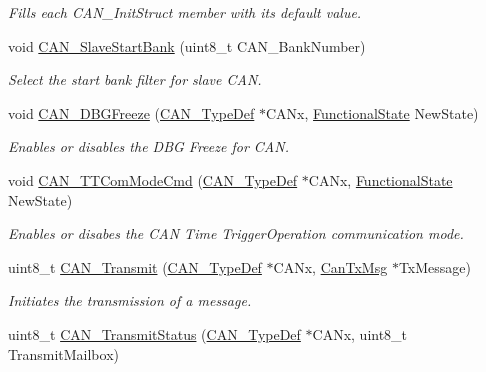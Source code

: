 \begin{DoxyCompactItemize}
\begin{DoxyCompactList}\small\item\em Fills each C\+A\+N\+\_\+\+Init\+Struct member with its default value. \end{DoxyCompactList}\item 
void \mbox{\hyperlink{group___c_a_n___private___functions_ga109ff8960bc59f44b984c9646f17b3c0}{C\+A\+N\+\_\+\+Slave\+Start\+Bank}} (uint8\+\_\+t C\+A\+N\+\_\+\+Bank\+Number)
\begin{DoxyCompactList}\small\item\em Select the start bank filter for slave C\+AN. \end{DoxyCompactList}\item 
void \mbox{\hyperlink{group___c_a_n___private___functions_gac0e2d33e08caf49d1f1251f0dcc20213}{C\+A\+N\+\_\+\+D\+B\+G\+Freeze}} (\mbox{\hyperlink{struct_c_a_n___type_def}{C\+A\+N\+\_\+\+Type\+Def}} $\ast$C\+A\+Nx, \mbox{\hyperlink{group___exported__types_gac9a7e9a35d2513ec15c3b537aaa4fba1}{Functional\+State}} New\+State)
\begin{DoxyCompactList}\small\item\em Enables or disables the D\+BG Freeze for C\+AN. \end{DoxyCompactList}\item 
void \mbox{\hyperlink{group___c_a_n___private___functions_ga94740177bab153ca5b102d122f9a8cca}{C\+A\+N\+\_\+\+T\+T\+Com\+Mode\+Cmd}} (\mbox{\hyperlink{struct_c_a_n___type_def}{C\+A\+N\+\_\+\+Type\+Def}} $\ast$C\+A\+Nx, \mbox{\hyperlink{group___exported__types_gac9a7e9a35d2513ec15c3b537aaa4fba1}{Functional\+State}} New\+State)
\begin{DoxyCompactList}\small\item\em Enables or disabes the C\+AN Time Trigger\+Operation communication mode. \end{DoxyCompactList}\item 
uint8\+\_\+t \mbox{\hyperlink{group___c_a_n___private___functions_gaccfcb81f76f58400077c7b2d8641dd83}{C\+A\+N\+\_\+\+Transmit}} (\mbox{\hyperlink{struct_c_a_n___type_def}{C\+A\+N\+\_\+\+Type\+Def}} $\ast$C\+A\+Nx, \mbox{\hyperlink{struct_can_tx_msg}{Can\+Tx\+Msg}} $\ast$Tx\+Message)
\begin{DoxyCompactList}\small\item\em Initiates the transmission of a message. \end{DoxyCompactList}\item 
uint8\+\_\+t \mbox{\hyperlink{group___c_a_n___private___functions_ga68ab05a0a6cdfcc2b6f6b6b2c10848e2}{C\+A\+N\+\_\+\+Transmit\+Status}} (\mbox{\hyperlink{struct_c_a_n___type_def}{C\+A\+N\+\_\+\+Type\+Def}} $\ast$C\+A\+Nx, uint8\+\_\+t Transmit\+Mailbox)

\end{DoxyCompactItemize}
